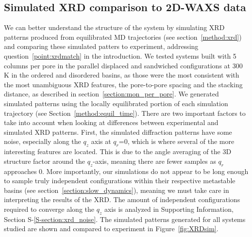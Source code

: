 \documentclass[journal=jpcbfk,manuscript=article]{achemso}
\begin{document}
  \subsection{Simulated XRD comparison to 2D-WAXS data}
  We can better understand the structure of the system by simulating XRD
  patterns produced from equilibrated MD trajectories (see
  section~\ref{method:xrd}) and comparing these simulated patters to experiment, addressing
  question~\ref{point:xrdmatch} in the introduction. We tested systems built with 5 columns per pore
  in the parallel displaced and sandwiched configurations at
  300 K in the ordered and disordered basins, as those were the most consistent
  with the most unambiguous XRD features, the pore-to-pore spacing
  and the stacking distance, as described in section~\ref{section:mon_per_pore}.  We generated simulated patterns using the locally
  equilibrated portion of each simulation trajectory (see
  Section~\ref{method:equil_time}). There are two important factors to take into
  account when looking at differences between experimental and simulated XRD patterns.
  First, the simulated diffraction patterns have some noise, especially along the
  $q_z$ axis at $q_r$=0, which is where several of the more interesting features
  are located. This is due to the angle averaging of the 3D structure factor
  around the $q_z$-axis, meaning there are fewer samples as $q_r$ approaches 0.
  More importantly, our simulations do not appear to be long enough to sample truly
  independent configurations within their respective metastable basins (see
  section~\ref{section:slow_dynamics}), meaning we must take care in interpreting
  the results of the XRD. The amount of independent configurations required to 
  converge along the $q_z$ axis is analyzed in Supporting Information, 
  Section S-\ref{S-section:xrd_noise}. The simulated patterns generated for all
  systems studied are shown and compared to experiment in Figure~\ref{fig:XRDsim}.
\end{document}
